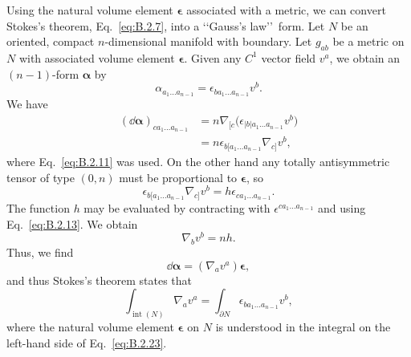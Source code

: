 Using the natural volume element \(\boldsymbol\epsilon\) associated with a metric, we
can convert Stokes's theorem, Eq.~\eqref{eq:B.2.7}, into a \lq\lq Gauss's law\rq\rq\
form. Let \(N\) be an oriented, compact \(n\)-dimensional manifold with boundary.
Let \(g_{ab}\) be a metric on \(N\) with associated volume element
\(\boldsymbol\epsilon\). Given any \(C^1\) vector field \(v^a\), we obtain an
\((n-1)\)-form \(\boldsymbol\alpha\) by
\begin{equation}
  \alpha_{a_1\ldots a_{n-1}}
  =\epsilon_{ba_1\ldots a_{n-1}}v^b.
  \tag{B.2.18}\label{eq:B.2.18}
\end{equation}
We have
\begin{equation}
  \begin{aligned}
  (\dd\boldsymbol\alpha)_{ca_1\ldots a_{n-1}}
  & =n\nabla_{[c}\bigl(\epsilon_{\lvert b\rvert a_1\ldots a_{n-1}}v^b\bigr)\\
  & =n\epsilon_{b[a_1\ldots a_{n-1}}\nabla_{c]}v^b,
  \end{aligned}
  \tag{B.2.19}\label{eq:B.2.19}
\end{equation}
where Eq.~\eqref{eq:B.2.11} was used. On the other hand any totally antisymmetric
tensor of type \((0,n)\) must be proportional to \(\boldsymbol\epsilon\), so
\begin{equation}
  \epsilon_{b[a_1\ldots a_{n-1}}\nabla_{c]}v^b
  =h\epsilon_{ca_1\ldots a_{n-1}}.
  \tag{B.2.20}\label{eq:B.2.20}
\end{equation}
The function \(h\) may be evaluated by contracting with
\(\epsilon^{ca_1\ldots a_{n-1}}\) and using Eq.~\eqref{eq:B.2.13}. We obtain
\begin{equation}
  \nabla_bv^b=nh.
  \tag{B.2.21}\label{eq:B.2.21}
\end{equation}
Thus, we find
\begin{equation}
  \dd\boldsymbol\alpha=(\nabla_av^a)\boldsymbol\epsilon,
  \tag{B.2.22}\label{eq:B.2.22}
\end{equation}
and thus Stokes's theorem states that
\begin{equation}
  \int_{\operatorname{int}(N)}\nabla_av^a
  =\int_{\partial N}\epsilon_{ba_1\ldots a_{n-1}}v^b,
  \tag{B.2.23}\label{eq:B.2.23}
\end{equation}
where the natural volume element \(\boldsymbol\epsilon\) on \(N\) is understood in
the integral on the left-hand side of Eq.~\eqref{eq:B.2.23}.

